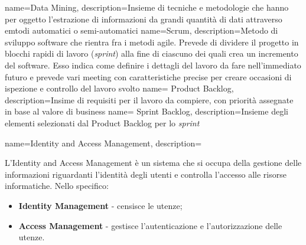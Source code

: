{
  name=Data Mining,
  description={Insieme di tecniche e metodologie che hanno per oggetto l'estrazione di informazioni da grandi quantità di dati attraverso
  emtodi automatici o semi-automatici}
}
{
	name=Scrum,
	description={Metodo di sviluppo software che rientra fra i metodi agile. Prevede di dividere il progetto in blocchi rapidi di lavoro (\textit{sprint}) alla fine di ciascuno dei quali crea un incremento del software. Esso indica come definire i dettagli del lavoro da fare nell'immediato futuro e prevede vari meeting con caratteristiche precise per creare occasioni di ispezione e controllo del lavoro svolto \cite{scrum}
	}
}
{
	name= Product Backlog,
	description={Insime di requisiti per il lavoro da compiere, con priorità assegnate in base al valore di business}
}
{
	name= Sprint Backlog,
	description={Insieme degli elementi selezionati dal Product Backlog per lo \textit{sprint}}
}
{
	name=Identity and Access Management,
	description={L'Identity and Access Management è un sistema che si occupa della gestione delle informazioni riguardanti l'identità degli utenti e controlla l'accesso alle risorse informatiche. Nello specifico:
	\begin{itemize}
		\item \textbf{Identity Management} - censisce le utenze;
		\item \textbf{Access Management} - gestisce l'autenticazione e l'autorizzazione delle utenze. 
	\end{itemize}}
}
